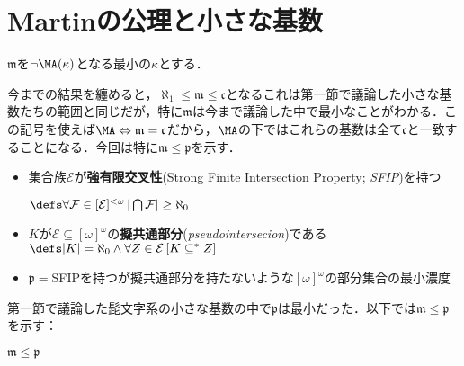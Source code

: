 \documentclass[a4j]{ltjsarticle}
\theoremstyle{definition}
\begin{document}
\section{Martinの公理と小さな基数}
\begin{definition}
 $\mathfrak{m}$を$\neg \MA(\kappa)$となる最小の$\kappa$とする．
\end{definition}
今までの結果を纏めると，$\aleph_1 \leq \mathfrak{m} \leq \mathfrak{c}$となるこれは第一節で議論した小さな基数たちの範囲と同じだが，特に$\mathfrak{m}$は今まで議論した中で最小なことがわかる．この記号を使えば$\MA \Leftrightarrow \mathfrak{m} = \mathfrak{c}$だから，$\MA$の下ではこれらの基数は全て$\mathfrak{c}$と一致することになる．今回は特に$\mathfrak{m} \leq \mathfrak{p}$を示す．

\begin{definition}
 \begin{itemize}
  \item 集合族$\mathcal{E}$が\textbf{強有限交叉性}(Strong Finite Intersection Property; \textit{SFIP})を持つ

	$\defs \forall \mathcal{F} \in [\mathcal{E}]^{<\omega} \, |\bigcap \mathcal{F}| \geq \aleph_0$
  \item $K$が$\mathcal{E} \subseteq [\omega]^\omega$の\textbf{擬共通部分}(\textit{pseudointersecion})である
	$\defs |K| = \aleph_0 \wedge \forall Z \in \mathcal{E} \,[ K \mathrel{\mathord{\subseteq}^*} Z]$
  \item $\mathfrak{p} = $SFIPを持つが擬共通部分を持たないような$[\omega]^\omega$の部分集合の最小濃度
 \end{itemize}
\end{definition}
第一節で議論した髭文字系の小さな基数の中で$\mathfrak{p}$は最小だった．以下では$\mathfrak{m} \leq \mathfrak{p}$を示す：
\begin{lemma}\label{lem:p}
 $\mathfrak{m} \leq \mathfrak{p}$
\end{lemma}
\end{document}
